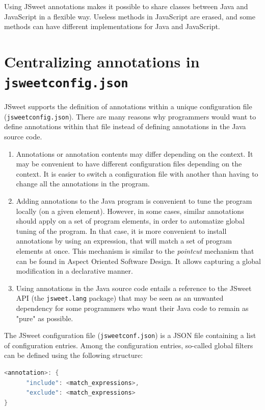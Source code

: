 \documentclass[a4paper]{report}
\begin{document}
Using JSweet annotations makes it possible to share classes between Java and JavaScript in a flexible way. Useless methods in JavaScript are erased, and some methods can have different implementations for Java and JavaScript.

\section{Centralizing annotations in \texttt{jsweetconfig.json}}

JSweet supports the definition of annotations within a unique configuration file (\texttt{jsweetconfig.json}). There are many reasons why programmers would want to define annotations within that file instead of defining annotations in the Java source code.

\begin{enumerate}
\item Annotations or annotation contents may differ depending on the context. It may be convenient to have different configuration files depending on the context. It is easier to switch a configuration file with another than having to change all the annotations in the program.
\item Adding annotations to the Java program is convenient to tune the program locally (on a given element). However, in some cases, similar annotations should apply on a set of program elements, in order to automatize global tuning of the program. In that case, it is more convenient to install annotations by using an expression, that will match a set of program elements at once. This mechanism is similar to the \emph{pointcut} mechanism that can be found in Aspect Oriented Software Design. It allows capturing a global modification in a declarative manner.
\item Using annotations in the Java source code entails a reference to the JSweet API (the \texttt{jsweet.lang} package) that may be seen as an unwanted dependency for some programmers who want their Java code to remain as "pure" as possible. 
\end{enumerate}

The JSweet configuration file (\texttt{jsweetconf.json}) is a JSON file containing a list of configuration entries. Among the configuration entries, so-called global filters can be defined using the following structure:

\begin{lstlisting}[language=Java]
<annotation>: {
      "include": <match_expressions>,
      "exclude": <match_expressions>
}
\end{lstlisting}
\end{document}
